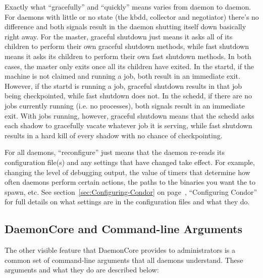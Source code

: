 Exactly what ``gracefully'' and ``quickly'' means varies from daemon
to daemon.  For daemons with little or no state (the kbdd, collector and
negotiator) there's no difference and both signals result in the
daemon shutting itself down basically right away.  For the master,
graceful shutdown just means it asks all of its children to perform
their own graceful shutdown methods, while fast shutdown means it asks
its children to perform their own fast shutdown methods.  In both
cases, the master only exits once all its children have exited.  In
the startd, if the machine is not claimed and running a job, both
result in an immediate exit.  However, if the startd is running a job,
graceful shutdown results in that job being checkpointed, while fast
shutdown does not.  In the schedd, if there are no jobs currently
running (i.e. no  processes), both signals result in an
immediate exit.  With jobs running, however, graceful shutdown means
that the schedd asks each shadow to gracefully vacate whatever job it
is serving, while fast shutdown results in a hard kill of every shadow
with no chance of checkpointing.  

For all daemons, ``reconfigure'' just means that the daemon re-reads
its configuration file(s) and any settings that have changed take effect.
For example, changing the level of debugging output, the value of
timers that determine how often daemons perform certain actions, the
paths to the binaries you want the  to spawn, etc.
See section~\ref{sec:Configuring-Condor} on
page~\pageref{sec:Configuring-Condor}, ``Configuring Condor'' for full
details on what settings are in the configuration files and what they do.

\subsection{\label{sec:DaemonCore-Arguments}DaemonCore and
Command-line Arguments} 

The other visible feature that DaemonCore provides to administrators
is a common set of command-line arguments that all daemons understand.
These arguments and what they do are described below:

